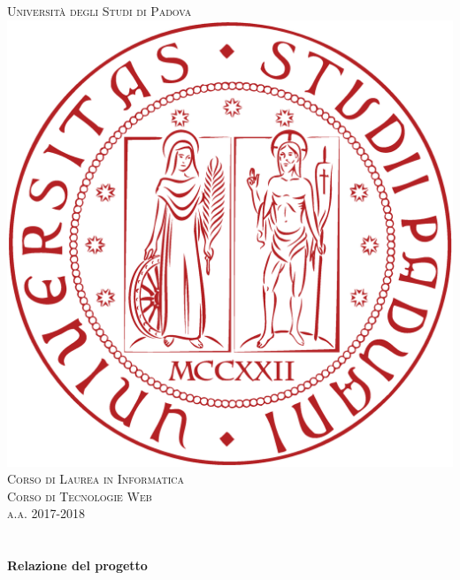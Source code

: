 {\begin{titlepage}
\textsc{\LARGE Università degli Studi di Padova}\\[1.5cm] %
\includegraphics[scale=.13]{logo.eps}\\[1cm] %
\textsc{\Large Corso di Laurea in Informatica}\\[0.5cm]
\textsc{\Large Corso di Tecnologie Web}\\[0.5cm] %
\textsc{\large a.a. 2017-2018}\\[0.5cm] %


\HRule \\[0.4cm]
{ \huge \bfseries \@title}\\[0.4cm] %
{ \Large \bfseries Relazione del progetto}\\[0.4cm] %
\HRule \\[1.5cm]
 


\end{titlepage}}
